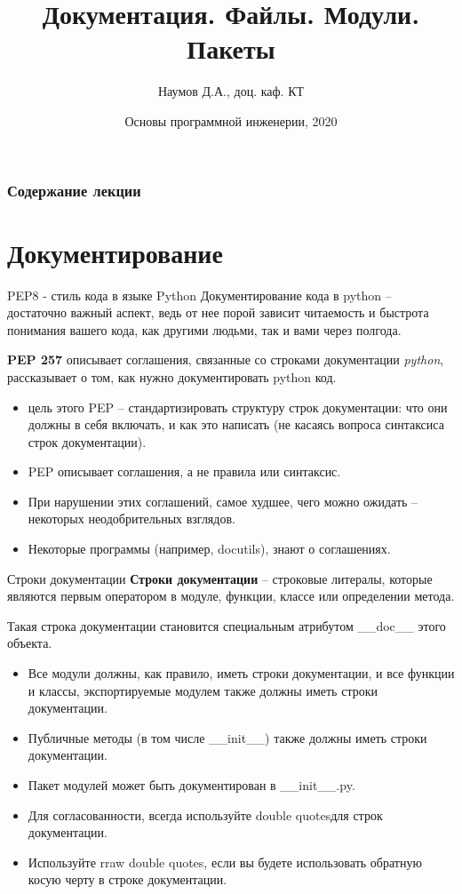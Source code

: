 \documentclass[xcolor=table]{beamer}
\title[Software Design]{Документация. Файлы. Модули. Пакеты}
\author{Наумов Д.А., доц. каф. КТ}
\date[22.11.2020] {Основы программной инженерии, 2020}
\begin{document}
\begin{frame}
  \titlepage
\end{frame}
  
\begin{frame}
  \frametitle{Содержание лекции}
  \tableofcontents  
\end{frame}

\section{Документирование}

\begin{frame}{PEP8 - стиль кода в языке Python}
	Документирование кода в python -- достаточно важный аспект, ведь от нее порой зависит читаемость и быстрота понимания вашего кода, как другими людьми, так и вами через полгода.
	
	\medskip
	
	\textbf{PEP 257} описывает соглашения, связанные со строками документации \textit{python}, рассказывает о том, как нужно документировать python код.
	\begin{itemize}
		\item цель этого PEP -- стандартизировать структуру строк документации: что они должны в
себя включать, и как это написать (не касаясь вопроса синтаксиса строк документации).
		\item PEP описывает соглашения, а не правила или синтаксис.
		\item При нарушении этих соглашений, самое худшее, чего можно ожидать -- некоторых
неодобрительных взглядов. 
		\item Некоторые программы (например, docutils), знают о соглашениях.
	\end{itemize}	
\end{frame}

\begin{frame}{Строки документации}
	\textbf{Строки документации} -- строковые литералы, которые являются первым оператором в модуле, функции, классе или определении метода. 
	
	\medskip
		
	Такая строка документации становится специальным атрибутом \_\_doc\_\_ этого объекта.
	
	\medskip
	
	\begin{itemize}
		\item Все модули должны, как правило, иметь строки документации, и все функции и классы,
экспортируемые модулем также должны иметь строки документации. 
		\item Публичные методы (в том числе \_\_init\_\_) также должны иметь строки документации. 
		\item Пакет модулей может быть документирован в \_\_init\_\_.py.
		\item Для согласованности, всегда используйте  \grqq\grqq\grqq double quotes\grqq\grqq\grqq для строк документации.
		\item Используйте r\grqq\grqq\grqq raw double quotes\grqq\grqq\grqq, если вы будете использовать обратную косую черту в строке документации.
	\end{itemize}	
\end{frame}
\end{document}
